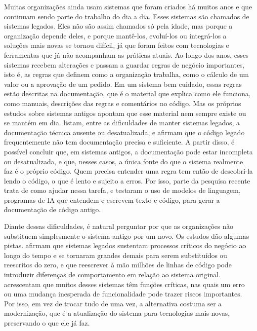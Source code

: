 Muitas organizações ainda usam sistemas que foram criados há muitos anos e que continuam sendo parte do trabalho do dia a dia. Esses sistemas são chamados de sistemas legados. Eles não são assim chamados só pela idade, mas porque a organização depende deles, e porque mantê-los, evoluí-los ou integrá-los a soluções mais novas se tornou difícil, já que foram feitos com tecnologias e ferramentas que já não acompanham as práticas atuais. Ao longo dos anos, esses sistemas recebem alterações e passam a guardar regras de negócio importantes, isto é, as regras que definem como a organização trabalha, como o cálculo de um valor ou a aprovação de um pedido. Em um sistema bem cuidado, essas regras estão descritas na documentação, que é o material que explica como ele funciona, como manuais, descrições das regras e comentários no código. Mas os próprios estudos sobre sistemas antigos apontam que esse material nem sempre existe ou se mantém em dia.  listam, entre as dificuldades de manter sistemas legados, a documentação técnica ausente ou desatualizada, e  afirmam que o código legado frequentemente não tem documentação precisa e suficiente. A partir disso, é possível concluir que, em sistemas antigos, a documentação pode estar incompleta ou desatualizada, e que, nesses casos, a única fonte do que o sistema realmente faz é o próprio código. Quem precisa entender uma regra tem então de descobri-la lendo o código, o que é lento e sujeito a erros. Por isso, parte da pesquisa recente trata de como ajudar nessa tarefa, e  testaram o uso de modelos de linguagem, programas de IA que entendem e escrevem texto e código, para gerar a documentação de código antigo.

Diante dessas dificuldades, é natural perguntar por que as organizações não substituem simplesmente o sistema antigo por um novo. Os estudos dão algumas pistas.  afirmam que sistemas legados sustentam processos críticos do negócio ao longo do tempo e se tornaram grandes demais para serem substituídos ou reescritos do zero, e que reescrever à mão milhões de linhas de código pode introduzir diferenças de comportamento em relação ao sistema original.  acrescentam que muitos desses sistemas têm funções críticas, nas quais um erro ou uma mudança inesperada de funcionalidade pode trazer riscos importantes. Por isso, em vez de trocar tudo de uma vez, a alternativa costuma ser a modernização, que é a atualização do sistema para tecnologias mais novas, preservando o que ele já faz.

